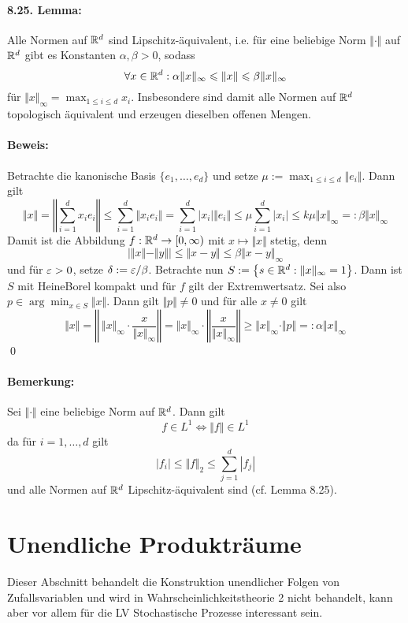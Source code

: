 \paragraph{8.25. Lemma:}Alle Normen auf $\mathbb{R}^d$ sind Lipschitz-\"aquivalent, i.e. f\"ur eine beliebige Norm $\Vert\cdot\Vert$ auf $\mathbb{R}^d$ gibt es Konstanten $\alpha,\beta>0$, sodass
$$\forall x\in\mathbb{R}^d:\alpha\Vert x\Vert_\infty\leqslant\Vert x\Vert\leqslant\beta\Vert x\Vert_\infty$$
f\"ur $\displaystyle\Vert x\Vert_\infty=\max_{1\leq i\leq d}x_i$. Insbesondere sind damit alle Normen auf $\mathbb{R}^d$ topologisch \"aquivalent und erzeugen dieselben offenen Mengen.

\paragraph{Beweis:}Betrachte die kanonische Basis $\{e_1,\hdots,e_d\}$ und setze $\displaystyle\mu:=\max_{1\leq i\leq d}\Vert e_i\Vert$. Dann gilt
$$\Vert x\Vert=\left\Vert\sum_{i=1}^d x_ie_i\right\Vert\leq\sum_{i=1}^d\Vert x_ie_i\Vert=\sum_{i=1}^d|x_i|\Vert e_i\Vert\leq\mu\sum_{i=1}^d|x_i|\leq k\mu\Vert x\Vert_\infty=:\beta\Vert x\Vert_\infty$$
Damit ist die Abbildung $f:\mathbb{R}^d\to[0,\infty)$ mit $x\mapsto\Vert x\Vert$ stetig, denn
$$\left|\Vert x\Vert-\Vert y\Vert\right|\leq\Vert x-y\Vert\leq\beta\Vert x-y\Vert_\infty$$ und f\"ur $\varepsilon>0$, setze $\delta:=\varepsilon/\beta$. Betrachte nun $S:=\left\{s\in\mathbb{R}^d:\Vert x\Vert_\infty=1\right\}$. Dann ist $S$ mit Heine\textendash Borel kompakt und f\"ur $f$ gilt der Extremwertsatz. Sei also $p\in\arg\min_{x\in S}\Vert x\Vert$. Dann gilt $\Vert p\Vert \neq0$ und f\"ur alle $x\neq0$ gilt
$$\Vert x\Vert=\left\Vert\ \Vert x\Vert_\infty\cdot\dfrac{x}{\Vert x\Vert_\infty} \right\Vert=\Vert x\Vert_\infty\cdot\left\Vert \dfrac{x}{\Vert x\Vert_\infty} \right\Vert\geq\Vert x\Vert_\infty\cdot\Vert p\Vert=:\alpha\Vert x\Vert_\infty$$
\qed

\paragraph{Bemerkung:}Sei $\Vert\cdot\Vert$ eine beliebige Norm auf $\mathbb{R}^d$. Dann gilt
$$f\in L^1\iff\Vert f\Vert\in L^1$$
da f\"ur $i=1,\hdots,d$ gilt
$$|f_i|\leq\Vert f\Vert_2\leq\sum_{j=1}^d|f_j|$$
und alle Normen auf $\mathbb{R}^d$ Lipschitz-\"aquivalent sind (cf. Lemma 8.25).


\section*{Unendliche Produktr\"aume}
Dieser Abschnitt behandelt die Konstruktion unendlicher Folgen von Zufallsvariablen und wird in Wahrscheinlichkeitstheorie 2 nicht behandelt, kann aber vor allem f\"ur die LV Stochastische Prozesse interessant sein. 

